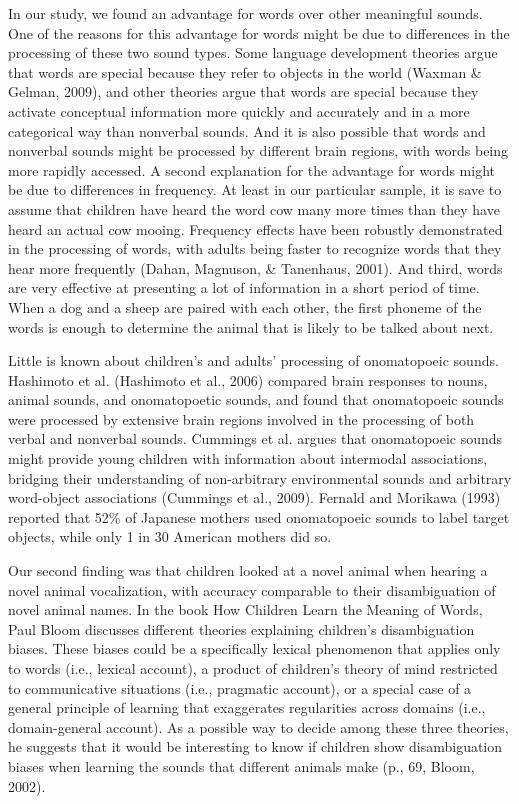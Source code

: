 \documentclass[english,floatsintext,man]{apa6}
\theoremstyle{definition}
\theoremstyle{definition}
\theoremstyle{definition}
\theoremstyle{remark}
\begin{document}
In our study, we found an advantage for words over other meaningful
sounds. One of the reasons for this advantage for words might be due to
differences in the processing of these two sound types. Some language
development theories argue that words are special because they refer to
objects in the world (Waxman \& Gelman, 2009), and other theories argue
that words are special because they activate conceptual information more
quickly and accurately and in a more categorical way than nonverbal
sounds. And it is also possible that words and nonverbal sounds might be
processed by different brain regions, with words being more rapidly
accessed. A second explanation for the advantage for words might be due
to differences in frequency. At least in our particular sample, it is
save to assume that children have heard the word cow many more times
than they have heard an actual cow mooing. Frequency effects have been
robustly demonstrated in the processing of words, with adults being
faster to recognize words that they hear more frequently (Dahan,
Magnuson, \& Tanenhaus, 2001). And third, words are very effective at
presenting a lot of information in a short period of time. When a dog
and a sheep are paired with each other, the first phoneme of the words
is enough to determine the animal that is likely to be talked about
next.

Little is known about children's and adults' processing of onomatopoeic
sounds. Hashimoto et al. (Hashimoto et al., 2006) compared brain
responses to nouns, animal sounds, and onomatopoetic sounds, and found
that onomatopoeic sounds were processed by extensive brain regions
involved in the processing of both verbal and nonverbal sounds. Cummings
et al. argues that onomatopoeic sounds might provide young children with
information about intermodal associations, bridging their understanding
of non-arbitrary environmental sounds and arbitrary word-object
associations (Cummings et al., 2009). Fernald and Morikawa (1993)
reported that 52\% of Japanese mothers used onomatopoeic sounds to label
target objects, while only 1 in 30 American mothers did so.

Our second finding was that children looked at a novel animal when
hearing a novel animal vocalization, with accuracy comparable to their
disambiguation of novel animal names. In the book How Children Learn the
Meaning of Words, Paul Bloom discusses different theories explaining
children's disambiguation biases. These biases could be a specifically
lexical phenomenon that applies only to words (i.e., lexical account), a
product of children's theory of mind restricted to communicative
situations (i.e., pragmatic account), or a special case of a general
principle of learning that exaggerates regularities across domains
(i.e., domain-general account). As a possible way to decide among these
three theories, he suggests that it would be interesting to know if
children show disambiguation biases when learning the sounds that
different animals make (p., 69, Bloom, 2002).
\end{document}
